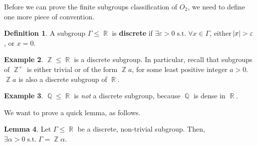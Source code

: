 \documentclass[11pt]{amsart} %
\theoremstyle{definition}
\newtheorem{definition}{Definition}[section]
\newtheorem{lemma}[definition]{Lemma}
\newtheorem{example}[definition]{Example}
\theoremstyle{definition}
\DeclareMathOperator{\Q}{\mathbb{Q}}
\DeclareMathOperator{\R}{\mathbb{R}}
\DeclareMathOperator{\Z}{\mathbb{Z}}
\DeclareMathOperator{\suchthat}{\text{ s.t. }}
\numberwithin{equation}{section}
\begin{document}
Before we can prove the finite subgroups classification of $O_2$, we need to define one more piece of convention.

\begin{definition}
	A subgroup $\Gamma \leq \R$ is \textbf{discrete} if $\exists \varepsilon>0 \suchthat \forall x \in \Gamma$, either $\abs{x} > \varepsilon$, or $x=0$.
\end{definition}

\begin{example}
	$\Z \leq \R$ is a discrete subgroup. In particular, recall that subgroups of $\Z^+$ is either trivial or of the form $\Z a$, for some least positive integer $a>0$. $\Z a$ is also a discrete subgroup of $\R$.
\end{example}

\begin{example}
	$\Q \leq \R$ is \textit{not} a discrete subgroup, because $\Q$ is dense in $\R$.
\end{example}

We want to prove a quick lemma, as follows.

\begin{lemma}
	\label{lemdiscreteZa}
	Let $\Gamma \leq \R$ be a discrete, non-trivial subgroup. Then, $\exists \alpha >0 \suchthat \Gamma = \Z \alpha$.
\end{lemma}
\end{document}
